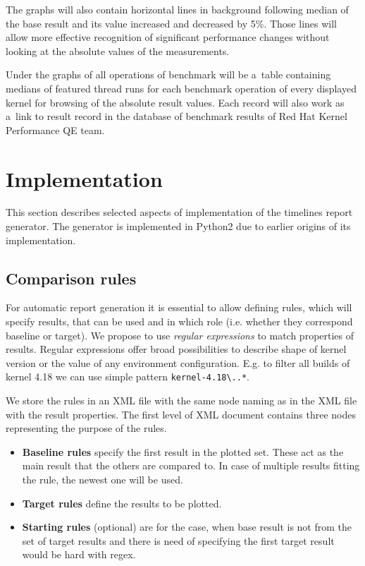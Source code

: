 The graphs will also contain horizontal lines in background following median of the
base result and its value increased and decreased by 5\%. Those lines will allow
more effective recognition of significant performance changes without looking at
the absolute values of the measurements.

Under the graphs of all operations of benchmark will be a~table containing medians
of featured thread runs for each benchmark operation of every displayed kernel
for browsing of the absolute result values. Each record will also work as a~link
to result record in the database of benchmark results of Red Hat Kernel
Performance QE team.

\section{Implementation}
This section describes selected aspects of implementation of the timelines
report generator. The generator is implemented in Python2 due to earlier origins
of its implementation.

\subsection{Comparison rules}
For automatic report generation it is essential to allow defining rules, which
will specify results, that can be used and in which role (i.e. whether they
correspond baseline or target). We propose to use \emph{regular expressions} to
match properties of results. Regular expressions offer broad possibilities to
describe shape of kernel version or the value of any environment configuration.
E.g. to filter all builds of kernel 4.18 we can use simple pattern
\texttt{kernel-4.18\textbackslash ..*}.

We store the rules in an XML file with the same node naming as in the XML file
with the result properties. The first level of XML document contains three nodes
representing the purpose of the rules.
\begin{itemize}
  \item \textbf{Baseline rules} specify the first result in the plotted set.
    These act as the main result that the others are compared to. In case of
    multiple results fitting the rule, the newest one will be used.
  \item \textbf{Target rules} define the results to be plotted.
  \item \textbf{Starting rules} (optional) are for the case, when base result is
    not from the set of target results and there is need of specifying the first
    target result would be hard with regex.
  \end{itemize}

